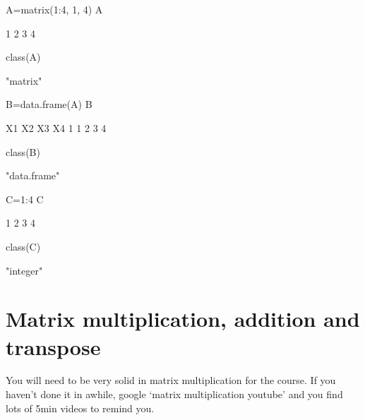 \begin{Schunk}
\begin{Sinput}
 A=matrix(1:4, 1, 4)
 A
\end{Sinput}
\begin{Soutput}
     [,1] [,2] [,3] [,4]
[1,]    1    2    3    4
\end{Soutput}
\begin{Sinput}
 class(A)
\end{Sinput}
\begin{Soutput}
[1] "matrix"
\end{Soutput}
\begin{Sinput}
 B=data.frame(A)
 B
\end{Sinput}
\begin{Soutput}
  X1 X2 X3 X4
1  1  2  3  4
\end{Soutput}
\begin{Sinput}
 class(B)
\end{Sinput}
\begin{Soutput}
[1] "data.frame"
\end{Soutput}
\begin{Sinput}
 C=1:4
 C
\end{Sinput}
\begin{Soutput}
[1] 1 2 3 4
\end{Soutput}
\begin{Sinput}
 class(C)
\end{Sinput}
\begin{Soutput}
[1] "integer"
\end{Soutput}
\end{Schunk}

\section{Matrix multiplication, addition and transpose}
You will need to be very solid in matrix multiplication for the course.  If you haven't done it in awhile, google `matrix multiplication youtube' and you find lots of 5min videos to remind you.

